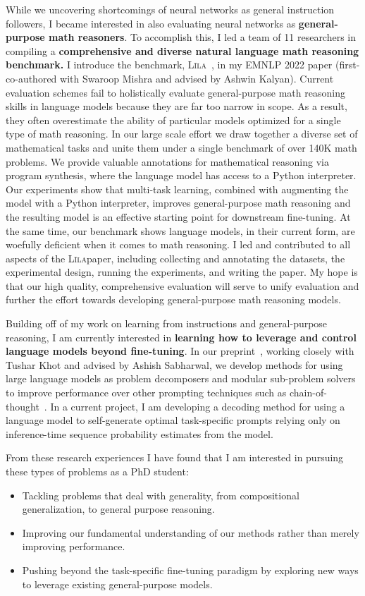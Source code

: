 \documentclass[12pt]{article}
\newcommand\lila{\textsc{L\={\i}la}}
\begin{document}
While we uncovering shortcomings of neural networks 
as general instruction followers,
I became interested in also evaluating neural networks as 
\textbf{general-purpose math reasoners}.
To accomplish this,
I led a team of 11 researchers in compiling a
\textbf{comprehensive and diverse natural language math reasoning benchmark.} 
I introduce the benchmark, \lila~\cite{Mishra2022Lila}, 
in my EMNLP 2022 paper (first-co-authored with Swaroop Mishra and advised by Ashwin Kalyan).
Current evaluation schemes fail to holistically evaluate 
general-purpose math reasoning skills in language models
because they are far too narrow in scope. 
As a result, they often overestimate the ability 
of particular models optimized for a single type of math reasoning.
In our large scale effort we draw together a diverse set of mathematical tasks 
and unite them under a single benchmark of over 140K math problems.
We provide valuable annotations for mathematical reasoning via program synthesis, 
where the language model has access to a Python interpreter.
Our experiments show that multi-task learning, 
combined with augmenting the model with a Python interpreter,
improves general-purpose math reasoning
and the resulting model is an effective starting point 
for downstream fine-tuning. 
At the same time, our benchmark shows language models, 
in their current form, 
are woefully deficient when it comes to math reasoning.
I led and contributed to all aspects of the \lila paper,
including collecting and annotating the datasets,
the experimental design, running the experiments, and writing the paper.
My hope is that our high quality, comprehensive evaluation  
will serve to unify evaluation
and further the effort towards developing general-purpose math reasoning models.

Building off of my work 
on learning from instructions and general-purpose reasoning, 
I am currently interested in
\textbf{learning how to leverage and control language models beyond fine-tuning}.
In our preprint~\cite{Khot2022DecomposedPA}, working closely with Tushar Khot and advised by Ashish Sabharwal, we develop methods for using large language models 
as problem decomposers and modular sub-problem solvers to improve performance over 
other prompting techniques such as chain-of-thought~\cite{}. 
In a current project, 
I am developing a decoding method for using a language model 
to self-generate optimal task-specific prompts 
relying only on inference-time sequence probability estimates from the model.

From these research experiences I have found that 
I am interested in pursuing these types of problems as a PhD student:
\begin{itemize}
  \item Tackling problems that deal with generality,
    from compositional generalization, to general purpose reasoning.
  \item Improving our fundamental understanding of our methods 
    rather than merely improving performance.
  \item Pushing beyond the task-specific fine-tuning paradigm
    by exploring new ways to leverage existing general-purpose models.
\end{itemize}
\end{document}

